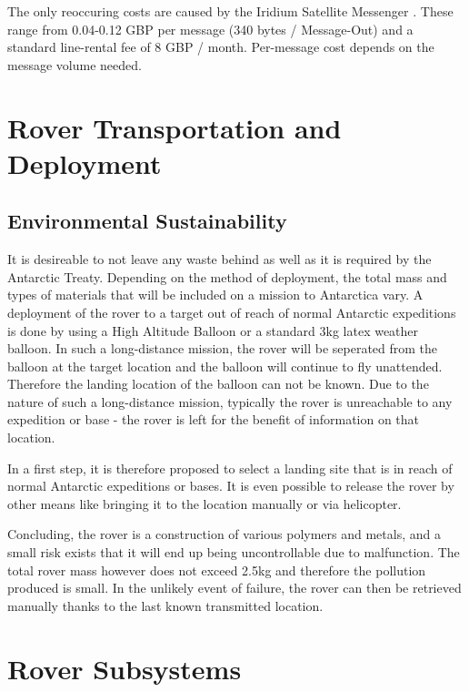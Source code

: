\documentclass[a4paper,12pt]{article}
\begin{document}
The only reoccuring costs are caused by the Iridium Satellite Messenger \cite{iridium}. These range from 0.04-0.12 GBP per message (340 bytes / Message-Out) and a standard line-rental fee of 8 GBP / month. Per-message cost depends on the message volume needed.



\section{Rover Transportation and Deployment}

	



\subsection{Environmental Sustainability}
It is desireable to not leave any waste behind as well as it is required by the Antarctic Treaty. Depending on the method of deployment, the total mass and types of materials that will be included on a mission to Antarctica vary. A deployment of the rover to a target out of reach of normal Antarctic expeditions is done by using a High Altitude Balloon or a standard 3kg latex weather balloon. In such a long-distance mission, the rover will be seperated from the balloon at the target location and the balloon will continue to fly unattended. Therefore the landing location of the balloon can not be known. Due to the nature of such a long-distance mission, typically the rover is unreachable to any expedition or base - the rover is left for the benefit of information on that location.

In a first step, it is therefore proposed to select a landing site that is in reach of normal Antarctic expeditions or bases. It is even possible to release the rover by other means like bringing it to the location manually or via helicopter.

Concluding, the rover is a construction of various polymers and metals, and a small risk exists that it will end up being uncontrollable due to malfunction. The total rover mass however does not exceed 2.5kg and therefore the pollution produced is small. In the unlikely event of failure, the rover can then be retrieved manually thanks to the last known transmitted location.




\section{Rover Subsystems}
\end{document}
